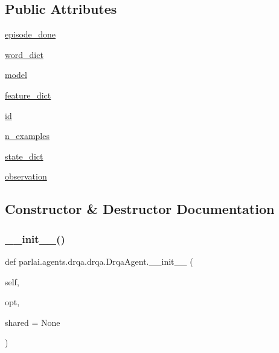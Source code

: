 \subsection*{Public Attributes}
\begin{DoxyCompactItemize}
\item 
\hyperlink{classparlai_1_1agents_1_1drqa_1_1drqa_1_1DrqaAgent_a313e13a6e6d878e5e37c5d27d8daed78}{episode\+\_\+done}
\item 
\hyperlink{classparlai_1_1agents_1_1drqa_1_1drqa_1_1DrqaAgent_aa49b71f40d0e4fb91062cab736f49146}{word\+\_\+dict}
\item 
\hyperlink{classparlai_1_1agents_1_1drqa_1_1drqa_1_1DrqaAgent_a4b32188969b359bb5b9e28766388a26e}{model}
\item 
\hyperlink{classparlai_1_1agents_1_1drqa_1_1drqa_1_1DrqaAgent_aad3576cea9fa96bdb5bf3d9a6209c93c}{feature\+\_\+dict}
\item 
\hyperlink{classparlai_1_1agents_1_1drqa_1_1drqa_1_1DrqaAgent_ac7b97d4092ac9dd221214832416b2002}{id}
\item 
\hyperlink{classparlai_1_1agents_1_1drqa_1_1drqa_1_1DrqaAgent_ac578c65b199b2d4115ee674fc93bb6a6}{n\+\_\+examples}
\item 
\hyperlink{classparlai_1_1agents_1_1drqa_1_1drqa_1_1DrqaAgent_a425092eeec6b948bcd9ed4765f6a4afc}{state\+\_\+dict}
\item 
\hyperlink{classparlai_1_1agents_1_1drqa_1_1drqa_1_1DrqaAgent_a31b47287b8b175d851b897aef7837990}{observation}
\end{DoxyCompactItemize}


\subsection{Constructor \& Destructor Documentation}
\mbox{\label{classparlai_1_1agents_1_1drqa_1_1drqa_1_1DrqaAgent_ab4fc521d734a88ec24fcc8ebb478fd11}} 
\subsubsection{\texorpdfstring{\+\_\+\+\_\+init\+\_\+\+\_\+()}{\_\_init\_\_()}}
{\footnotesize\ttfamily def parlai.\+agents.\+drqa.\+drqa.\+Drqa\+Agent.\+\_\+\+\_\+init\+\_\+\+\_\+ (\begin{DoxyParamCaption}\item[{}]{self,  }\item[{}]{opt,  }\item[{}]{shared = {\ttfamily None} }\end{DoxyParamCaption})}



